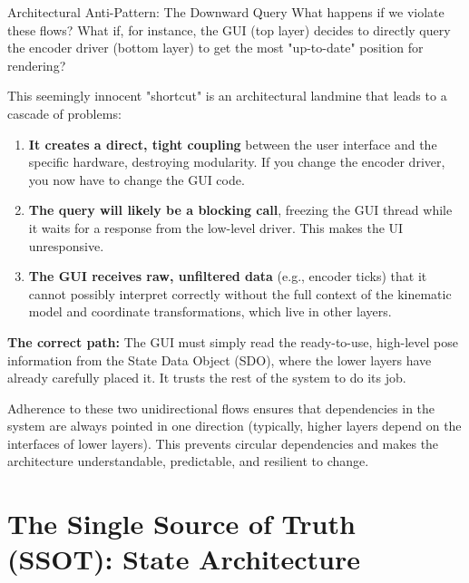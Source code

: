 \begin{dangerbox}{Architectural Anti-Pattern: The Downward Query}
    What happens if we violate these flows? What if, for instance, the GUI (top layer) decides to directly query the encoder driver (bottom layer) to get the most "up-to-date" position for rendering?
    
    This seemingly innocent "shortcut" is an architectural landmine that leads to a cascade of problems:
    \begin{enumerate}
        \item \textbf{It creates a direct, tight coupling} between the user interface and the specific hardware, destroying modularity. If you change the encoder driver, you now have to change the GUI code.
        \item \textbf{The query will likely be a blocking call}, freezing the GUI thread while it waits for a response from the low-level driver. This makes the UI unresponsive.
        \item \textbf{The GUI receives raw, unfiltered data} (e.g., encoder ticks) that it cannot possibly interpret correctly without the full context of the kinematic model and coordinate transformations, which live in other layers.
    \end{enumerate}
    \textbf{The correct path:} The GUI must simply read the ready-to-use, high-level pose information from the State Data Object (SDO), where the lower layers have already carefully placed it. It trusts the rest of the system to do its job.
\end{dangerbox}

Adherence to these two unidirectional flows ensures that dependencies in the system are always pointed in one direction (typically, higher layers depend on the interfaces of lower layers). This prevents circular dependencies and makes the architecture understandable, predictable, and resilient to change.






\section{The Single Source of Truth (SSOT): State Architecture}
\label{sec:ssot_architecture}

